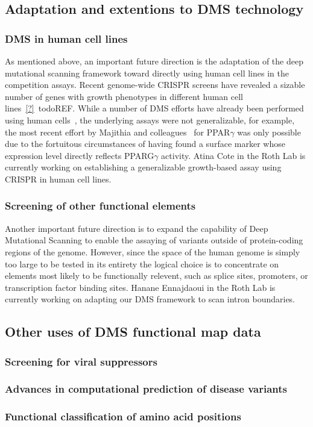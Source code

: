 \subsection{Adaptation and extentions to DMS technology}
\subsubsection{DMS in human cell lines}
As mentioned above, an important future direction is the adaptation of the deep mutational scanning framework toward directly using human cell lines in the competition assays. Recent genome-wide CRISPR screens have revealed a sizable number of genes with growth phenotypes in different human cell lines~\ref{?}~todo{REF}. While a number of DMS efforts have already been performed using human cells~\cite{forsyth_deep_2013,wagenaar_resistance_2014,doud_site-specific_2015,majithia_prospective_2016}, the underlying assays were not generalizable, for example, the most recent effort by Majithia and colleagues~\cite{majithia_prospective_2016} for PPAR$\gamma$ was only possible due to the fortuitous circumstances of having found a surface marker whose expression level directly reflects PPARG$\gamma$ activity. 
Atina Cote in the Roth Lab is currently working on establishing a generalizable growth-based assay using CRISPR in human cell lines. 

\subsubsection{Screening of other functional elements}
Another important future direction is to expand the capability of Deep Mutational Scanning to enable the assaying of variants outside of protein-coding regions of the genome. However, since the space of the human genome is simply too large to be tested in its entirety the logical choice is to concentrate on elements most likely to be functionally relevent, such as splice sites, promoters, or transcription factor binding sites.
Hanane Ennajdaoui in the Roth Lab is currently working on adapting our DMS framework to scan intron boundaries.

\subsection{Other uses of DMS functional map data}

\subsubsection{Screening for viral suppressors}

\subsubsection{Advances in computational prediction of disease variants}

\subsubsection{Functional classification of amino acid positions}

